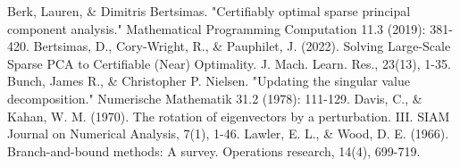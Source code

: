\documentclass{article}
\begin{document}
\begin{thebibliography}{9}
     Berk, Lauren, \& Dimitris Bertsimas. "Certifiably optimal sparse principal component analysis." Mathematical Programming Computation 11.3 (2019): 381-420.
     Bertsimas, D., Cory-Wright, R., \& Pauphilet, J. (2022). Solving Large-Scale Sparse PCA to Certifiable (Near) Optimality. J. Mach. Learn. Res., 23(13), 1-35.
     Bunch, James R., \& Christopher P. Nielsen. "Updating the singular value decomposition." Numerische Mathematik 31.2 (1978): 111-129.
     Davis, C., \& Kahan, W. M. (1970). The rotation of eigenvectors by a perturbation. III. SIAM Journal on Numerical Analysis, 7(1), 1-46.
     Lawler, E. L., \& Wood, D. E. (1966). Branch-and-bound methods: A survey. Operations research, 14(4), 699-719.
\end{thebibliography}
\end{document}
